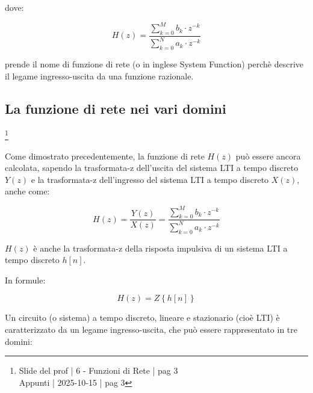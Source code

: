 dove: 

{
    \Large 
    \begin{equation}
        H \left(z\right)
        =
        \dfrac{\sum_{k = 0}^{M}
        b_k \cdot z^{-k}
        }{\sum_{k = 0}^{N}
        a_k \cdot z^{-k}} 
    \end{equation}

}

prende il nome di funzione di rete (o in inglese System Function) perchè descrive il legame ingresso-uscita da una funzione razionale. \newline 

\newpage 

\subsection{La funzione di rete nei vari domini}

\footnote{ 
    Slide del prof | 6 - Funzioni di Rete | pag 3\\
    Appunti | 2025-10-15 | pag 3  
}

Come dimostrato precedentemente, la funzione di rete $H \left(z\right)$ può essere ancora calcolata, 
sapendo la trasformata-z dell'uscita del sistema LTI a tempo discreto $Y \left(z\right)$ 
e  la trasformata-z dell'ingresso del sistema LTI a tempo discreto $X \left(z\right)$, anche come: 

{
    \Large 
    \begin{equation}
        H \left( z\right)
        = 
        \dfrac{Y \left(z\right)}{X \left(z\right)}
        = 
        \dfrac{\sum_{k = 0}^{M}
        b_k \cdot z^{-k}
        }{\sum_{k = 0}^{N}
        a_k \cdot z^{-k}} 
    \end{equation}
}

$H \left(z\right)$ è anche la trasformata-z della risposta impulsiva di un sistema LTI a tempo discreto $h \left[ n\right]$. \newline 

In formule: 

{
    \Large 
    \begin{equation}
        H \left( z\right)
        = 
        Z \left\{ h \left[ n\right]\right\}
    \end{equation}
}

Un circuito (o sistema) a tempo discreto, lineare e stazionario (cioè LTI) è caratterizzato da un legame ingresso-uscita, 
che può essere rappresentato in tre domini: \newline 

